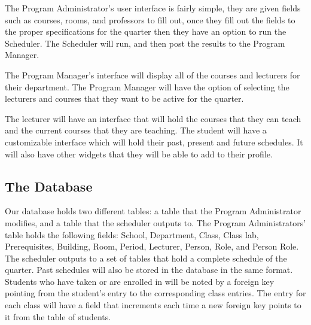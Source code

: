 \documentclass[12pt]{article}
\begin{document}
The Program Administrator's user interface is fairly simple, they are given fields such as courses, rooms, and professors to fill out, once they fill out the fields to the proper specifications for the quarter then they have an option to run the Scheduler. The Scheduler will run, and then post the results to the Program Manager.

The Program Manager's interface will display all of the courses and lecturers for their department. The Program Manager will have the option of selecting the lecturers and courses that they want to be active for the quarter.

The lecturer will have an interface that will hold the courses that they can teach and the current courses that they are teaching. 
The student will have a customizable interface which will hold their past, present and future schedules. It will also have other widgets that they will be able to add to their profile.
\subsection{The Database}
Our database holds two different tables: a table that the Program Administrator modifies, and a table that the scheduler outputs to.
    The Program Administrators' table holds the following fields: School, Department, Class, Class lab, Prerequisites, Building, Room, Period, Lecturer, Person, Role, and Person Role.
	The scheduler outputs to a set of tables that hold a complete schedule of the quarter. Past schedules will also be stored in the database in the same format. Students who have taken or are enrolled in will be noted by a foreign key pointing from the student's entry to the corresponding class entries. The entry for each class will have a field that increments each time a new foreign key points to it from the table of students.
\end{document}
